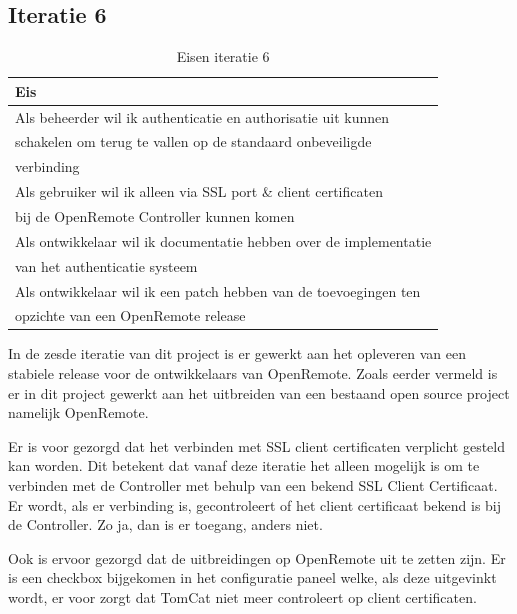 \documentclass[]{article}
\begin{document}
\subsection{Iteratie 6}
\begin{table}[htpb]
  \caption{Eisen iteratie 6}
  \begin{center}
    \begin{tabular}{|| l ||}\hline
        Eis                                                              \\\hline\hline
        Als beheerder wil ik authenticatie en authorisatie uit kunnen    \\
        schakelen om terug te vallen op de standaard onbeveiligde        \\ 
        verbinding                                                       \\\hline
        Als gebruiker wil ik alleen via SSL port \& client certificaten  \\ 
        bij de OpenRemote Controller kunnen komen                        \\\hline
        Als ontwikkelaar wil ik documentatie hebben over de implementatie\\ 
        van het authenticatie systeem                                    \\\hline
        Als ontwikkelaar wil ik een patch hebben van de toevoegingen ten \\
        opzichte van een OpenRemote release                              \\\hline
    \end{tabular}
  \end{center}
\end{table}

In de zesde iteratie van dit project is er gewerkt aan het opleveren van een
stabiele release voor de ontwikkelaars van OpenRemote. Zoals eerder vermeld is
er in dit project gewerkt aan het uitbreiden van een bestaand open source
project namelijk OpenRemote. 

Er is voor gezorgd dat het verbinden met SSL client certificaten verplicht
gesteld kan worden. Dit betekent dat vanaf deze iteratie het alleen mogelijk is
om te verbinden met de Controller met behulp van een bekend SSL Client
Certificaat. Er wordt,
als er verbinding is, gecontroleert of het client certificaat bekend
is bij de Controller. Zo ja, dan is er toegang, anders niet.

Ook is ervoor gezorgd dat de uitbreidingen op OpenRemote uit te zetten
zijn. Er is een checkbox bijgekomen in het configuratie paneel welke, als
deze uitgevinkt wordt, er voor zorgt dat TomCat niet meer controleert op client
certificaten. 
\end{document}

